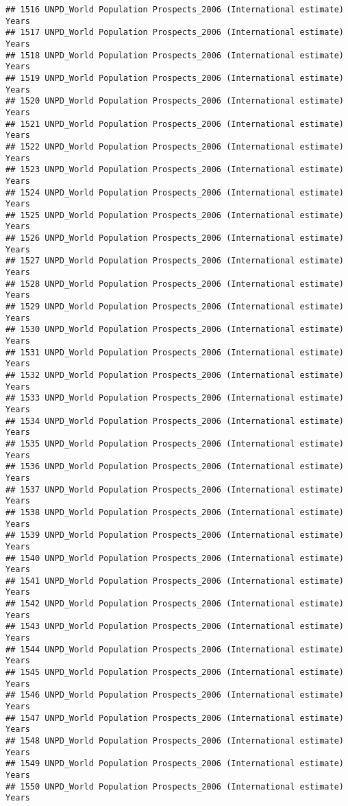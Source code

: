 \documentclass[]{article}
\begin{document}
\begin{verbatim}
## 1516 UNPD_World Population Prospects_2006 (International estimate) Years
## 1517 UNPD_World Population Prospects_2006 (International estimate) Years
## 1518 UNPD_World Population Prospects_2006 (International estimate) Years
## 1519 UNPD_World Population Prospects_2006 (International estimate) Years
## 1520 UNPD_World Population Prospects_2006 (International estimate) Years
## 1521 UNPD_World Population Prospects_2006 (International estimate) Years
## 1522 UNPD_World Population Prospects_2006 (International estimate) Years
## 1523 UNPD_World Population Prospects_2006 (International estimate) Years
## 1524 UNPD_World Population Prospects_2006 (International estimate) Years
## 1525 UNPD_World Population Prospects_2006 (International estimate) Years
## 1526 UNPD_World Population Prospects_2006 (International estimate) Years
## 1527 UNPD_World Population Prospects_2006 (International estimate) Years
## 1528 UNPD_World Population Prospects_2006 (International estimate) Years
## 1529 UNPD_World Population Prospects_2006 (International estimate) Years
## 1530 UNPD_World Population Prospects_2006 (International estimate) Years
## 1531 UNPD_World Population Prospects_2006 (International estimate) Years
## 1532 UNPD_World Population Prospects_2006 (International estimate) Years
## 1533 UNPD_World Population Prospects_2006 (International estimate) Years
## 1534 UNPD_World Population Prospects_2006 (International estimate) Years
## 1535 UNPD_World Population Prospects_2006 (International estimate) Years
## 1536 UNPD_World Population Prospects_2006 (International estimate) Years
## 1537 UNPD_World Population Prospects_2006 (International estimate) Years
## 1538 UNPD_World Population Prospects_2006 (International estimate) Years
## 1539 UNPD_World Population Prospects_2006 (International estimate) Years
## 1540 UNPD_World Population Prospects_2006 (International estimate) Years
## 1541 UNPD_World Population Prospects_2006 (International estimate) Years
## 1542 UNPD_World Population Prospects_2006 (International estimate) Years
## 1543 UNPD_World Population Prospects_2006 (International estimate) Years
## 1544 UNPD_World Population Prospects_2006 (International estimate) Years
## 1545 UNPD_World Population Prospects_2006 (International estimate) Years
## 1546 UNPD_World Population Prospects_2006 (International estimate) Years
## 1547 UNPD_World Population Prospects_2006 (International estimate) Years
## 1548 UNPD_World Population Prospects_2006 (International estimate) Years
## 1549 UNPD_World Population Prospects_2006 (International estimate) Years
## 1550 UNPD_World Population Prospects_2006 (International estimate) Years

\end{verbatim}
\end{document}
